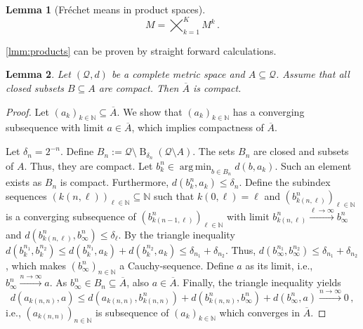 \documentclass{scrartcl}
\renewcommand{\subset}{\subseteq}
\DeclareMathOperator{\ball}{\mathrm{B}}
\newcommand*{\mc}[1]{\mathcal{#1}}
\newcommand{\N}{\mathbb{N}}
\newcommand{\equationFullstop}{\, .}
\newcommand{\eqfs}{\equationFullstop}
\newcommand{\equationComma}{\, ,}
\newcommand{\eqcm}{\equationComma}
\DeclareMathOperator*{\argmin}{arg\,min}
\theoremstyle{plain}\newtheorem{theorem}{Theorem}[section]
\newtheorem{lemma}[theorem]{Lemma}
\theoremstyle{definition}
\theoremstyle{remark}
\begin{document}
\begin{appendix}
\begin{lemma}[Fréchet means in product spaces]
\begin{equation*}
	M = \bigtimes_{k=1}^K M^k
	\eqfs
\end{equation*}
\end{lemma}
\autoref{lmm:products} can be proven by straight forward calculations.
 \begin{lemma}\label{lmm:precompact}
Let $(\mc Q, d)$ be a complete metric space and $A\subset \mc Q$. Assume that all closed subsets $B\subset A$ are compact. Then $\overline A$ is compact.
\end{lemma}
\begin{proof}
	Let $(a_k)_{k\in\N}\subset \overline{A}$. We show that $(a_k)_{k\in\N}$ has a converging subsequence with limit $a \in \overline{A}$, which implies compactness of $\overline{A}$.
	
	Let $\delta_n = 2^{-n}$. Define $B_n := \mc Q \setminus \ball_{\delta_n}(\mc Q \setminus A)$. The sets $B_n$ are closed and subsets of $A$. Thus, they are compact. Let $b_k^n\in\argmin_{b \in B_n} d(b, a_k)$. Such an element exists as $B_n$ is compact. Furthermore, $d(b_k^n, a_k) \leq \delta_n$. Define the subindex sequences $(k(n,\ell))_{\ell\in\N} \subset \N$ such that $k(0, \ell) = \ell$ and $(b^n_{k(n, \ell)})_{\ell\in\N}$ is a converging subsequence of $(b^n_{k(n-1, \ell)})_{\ell\in\N}$ with limit $b^n_{k(n, \ell)} \xrightarrow{\ell\to\infty}b^n_\infty$ and $d(b^n_{k(n, \ell)}, b^n_\infty) \leq \delta_\ell$. By the triangle inequality $d(b^{n_1}_k, b^{n_2}_k) \leq d(b^{n_1}_k, a_k) + d(b^{n_2}_k, a_k) \leq \delta_{n_1}+\delta_{n_2}$. Thus, $d(b^{n_1}_\infty, b^{n_2}_\infty) \leq \delta_{n_1}+\delta_{n_2}$, which makes $(b^{n}_\infty)_{n\in\N}$ a Cauchy-sequence. Define $a$ as its limit, i.e., $b^{n}_\infty \xrightarrow{n\to\infty} a$. As $b^{n}_\infty\in B_n \subset\overline{A}$, also $a\in\overline{A}$. Finally, the triangle inequality yields
	\begin{equation*}
		d(a_{k(n, n)}, a) \leq d(a_{k(n, n)}, b^n_{k(n, n)}) + d(b^n_{k(n, n)}, b^{n}_\infty) + d(b^{n}_\infty, a) \xrightarrow{n\to\infty}0\eqcm
	\end{equation*}
	i.e., $(a_{k(n, n)})_{n\in\N}$ is subsequence of $(a_k)_{k\in\N}$ which converges in $\overline{A}$.
\end{proof}
 \end{appendix}


\end{document}
